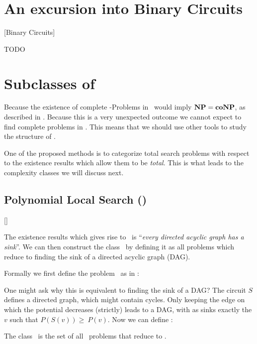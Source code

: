 \section{An excursion into Binary Circuits}[Binary Circuits]

TODO

\section{Subclasses of \TFNP}

Because the existence of complete \FNP-Problems in \TFNP\, would imply $\textbf{NP} = \textbf{coNP}$, as described in .
Because this is a very unexpected outcome we cannot expect to find complete problems in \TFNP.
This means that we should use other tools to study the structure of \TFNP. \par
One of the proposed methods  is to categorize total search problems with respect to the existence results which allow
them to be \textit{total}. This is what leads to the complexity classes we will discuss next.

\subsection{Polynomial Local Search (\PLS)}[\PLS]

The existence results which gives rise to \PLS\ is ``\textit{every directed acyclic graph has a sink}''.
We can then construct the class \PLS\ by defining it as all problems which reduce to finding the sink of a directed acyclic graph (DAG). \par
Formally we first define the problem \Localopt\ as in :


One might ask why this is equivalent to finding the sink of a DAG?
The circuit $S$ defines a directed graph, which might contain cycles.
Only keeping the edge on which the potential decreases (strictly) leads to a DAG, with as sinks exactly the $v$ such that $P(S(v)) \geq\ P(v)$. Now we can
define \PLS :

\begin{definition}
    The class \PLS\ is the set of all \TFNP\ problems that reduce to \Localopt.
\end{definition}

